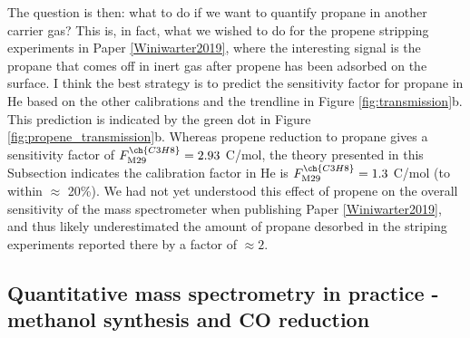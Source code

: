 The question is then: what to do if we want to quantify propane in another carrier gas? This is, in fact, what we wished to do for the propene stripping experiments in Paper \ref{Winiwarter2019}, where the interesting signal is the propane that comes off in inert gas after propene has been adsorbed on the surface. I think the best strategy is to predict the sensitivity factor for propane in He based on the other calibrations and the trendline in Figure \ref{fig:transmission}b. This prediction is indicated by the green dot in Figure \ref{fig:propene_transmission}b. Whereas propene reduction to propane gives a sensitivity factor of $F^{\ch{C3H8}}_\text{M29} = 2.93$ C/mol, the theory presented in this Subsection indicates the calibration factor in He is $F^{\ch{C3H8}}_\text{M29} = 1.3$ C/mol (to within $\approx$ 20\%). We had not yet understood this effect of propene on the overall sensitivity of the mass spectrometer when publishing Paper \ref{Winiwarter2019}, and thus likely underestimated the amount of propane desorbed in the striping experiments reported there by a factor of $\approx 2$.


\subsection{Quantitative mass spectrometry in practice - methanol synthesis and CO reduction}\label{subsec:in_practice}

